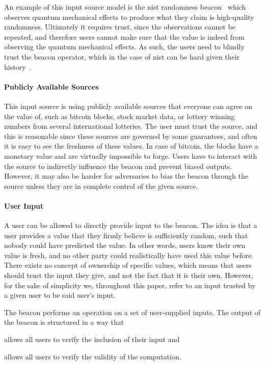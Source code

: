 An example of this input source model is the \gls{nist} randomness beacon~\cite{nistbeacon} which observes quantum mechanical effects to produce what they claim is high-quality randomness.
Ultimately it requires trust, since the observations cannot be repeated, and therefore users cannot make sure that the value is indeed from observing the quantum mechanical effects.
As such, the users need to blindly trust the beacon operator, which in the case of \gls{nist} can be hard given their history~\cite{nist2014backdoor, nytimes-nsaconstants, nytimes-nsabackdoors}.

\paragraph{Publicly Available Sources}
This input source is using publicly available sources that everyone can agree on the value of, such as bitcoin blocks, stock market data, or lottery winning numbers from several international lotteries.
The user must trust the source, and this is reasonable since these sources are governed by some guarantees, and often it is easy to see the freshness of these values.
In case of bitcoin, the blocks have a monetary value and are virtually impossible to forge.
Users have to interact with the source to indirectly influence the beacon and prevent biased outputs.
However, it may also be harder for adversaries to bias the beacon through the source unless they are in complete control of the given source.

\paragraph{User Input}
A user can be allowed to directly provide input to the beacon.
The idea is that a user provides a value that they firmly believe is sufficiently random, such that nobody could have predicted the value.
In other words, users know their own value is fresh, and no other party could realistically have used this value before.
There exists no concept of ownership of specific values, which means that users should trust the input they give, and not the fact that it is their own.
However, for the sake of simplicity we, throughout this paper, refer to an input trusted by a given user to be said user's input.

The beacon performs an operation on a set of user-supplied inputs.
The output of the beacon is structured in a way that
\begin{eletterate*}
    \item allows all users to verify the inclusion of their input and
    \item allows all users to verify the validity of the computation.
\end{eletterate*}

